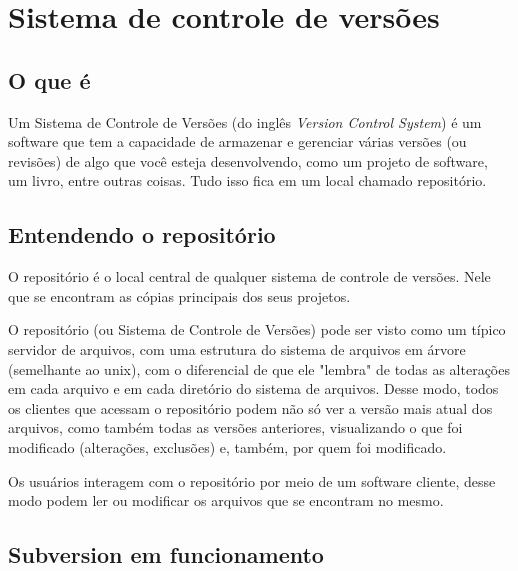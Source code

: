 \section {Sistema de controle de versões}

\subsection {O que é}

Um Sistema de Controle de Versões (do inglês \textit{Version Control System}) é um software que tem a capacidade de armazenar e gerenciar várias versões (ou revisões) de algo que você esteja desenvolvendo, como um projeto de software, um livro, entre outras coisas. Tudo isso fica em um local chamado repositório.

\subsection {Entendendo o repositório}

O repositório é o local central de qualquer sistema de controle de versões. Nele que se encontram as cópias principais dos seus projetos.

O repositório (ou Sistema de Controle de Versões) pode ser visto como um típico servidor de arquivos, com uma estrutura do sistema de arquivos em árvore (semelhante ao unix), com o diferencial de que ele "lembra" de todas as alterações em cada arquivo e em cada diretório do sistema de arquivos. Desse modo, todos os clientes que acessam o repositório podem não só ver a versão mais atual dos arquivos, como também todas as versões anteriores, visualizando o que foi modificado (alterações, exclusões) e, também, por quem foi modificado.

Os usuários interagem com o repositório por meio de um software cliente, desse modo podem ler ou modificar os arquivos que se encontram no mesmo.

\subsection {Subversion em funcionamento}


